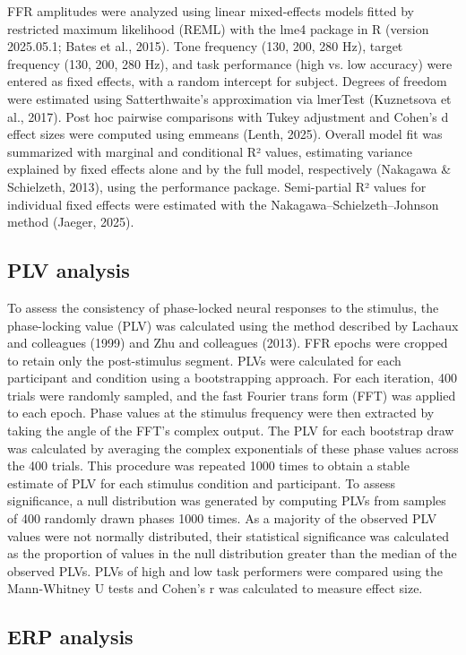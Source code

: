 \documentclass{article}
\begin{document}
FFR amplitudes were analyzed using linear mixed-effects models fitted by restricted maximum likelihood (REML) with the lme4 package in R (version 2025.05.1; Bates et al., 2015). Tone frequency (130, 200, 280 Hz), target frequency (130, 200, 280 Hz), and task performance (high vs. low accuracy) were entered as fixed effects, with a random intercept for subject. Degrees of freedom were estimated using Satterthwaite’s approximation via lmerTest (Kuznetsova et al., 2017). Post hoc pairwise comparisons with Tukey adjustment and Cohen’s d effect sizes were computed using emmeans (Lenth, 2025). Overall model fit was summarized with marginal and conditional R² values, estimating variance explained by fixed effects alone and by the full model, respectively (Nakagawa \& Schielzeth, 2013), using the performance package. Semi-partial R² values for individual fixed effects were estimated with the Nakagawa–Schielzeth–Johnson method (Jaeger, 2025).

\subsection*{PLV analysis}
					
To assess the consistency of phase-locked neural responses to the stimulus, the phase-locking value (PLV) was calculated using the method described by Lachaux and colleagues (1999) and Zhu and colleagues (2013). FFR epochs were cropped to retain only the post-stimulus segment. PLVs were calculated for each participant and condition using a bootstrapping approach. For each iteration, 400 trials were randomly sampled, and the fast Fourier trans form (FFT) was applied to each epoch. Phase values at the stimulus frequency were then extracted by taking the angle of the FFT’s complex output. The PLV for each bootstrap draw was calculated by averaging the complex exponentials of these phase values across the 400 trials. This procedure was repeated 1000 times to obtain a stable estimate of PLV for each stimulus condition and participant. To assess significance, a null distribution was generated by computing PLVs from samples of 400 randomly drawn phases 1000 times. As a majority of the observed PLV values were not normally distributed, their statistical significance was calculated as the proportion of values in the null distribution greater than the median of the observed PLVs. PLVs of high and low task performers were compared using the Mann-Whitney U tests and Cohen’s r was calculated to measure effect size.
					
\subsection*{ERP analysis}
					
\end{document}
